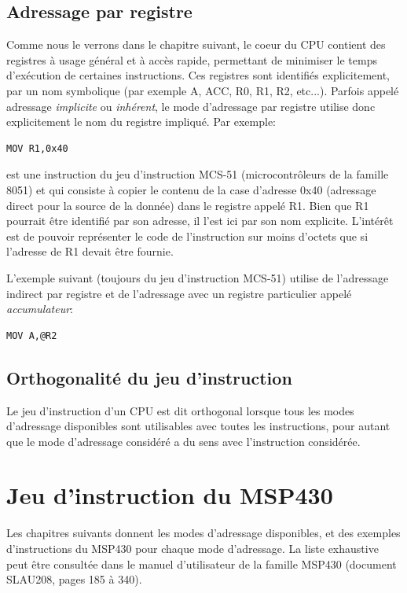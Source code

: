 \subsection{Adressage par registre}
Comme nous le verrons dans le chapitre suivant, le coeur du CPU contient des registres à usage général et à accès rapide, permettant de minimiser le temps d'exécution de certaines instructions. Ces registres sont identifiés explicitement, par un nom symbolique (par exemple A, ACC, R0, R1, R2, etc...).
Parfois appelé adressage \textit{implicite} ou \textit{inhérent}, le mode d'adressage par registre utilise donc explicitement le nom du registre impliqué. Par exemple:
\lstset{style=customc}
\begin{lstlisting}
MOV R1,0x40
\end{lstlisting}
est une instruction du jeu d'instruction MCS-51 (microcontrôleurs de la famille 8051) et qui consiste à copier le contenu de la case d'adresse 0x40 (adressage direct pour la source de la donnée) dans le registre appelé R1. Bien que R1 pourrait être identifié par son adresse, il l'est ici par son nom explicite. L'intérêt est de pouvoir représenter le code de l'instruction sur moins d'octets que si l'adresse de R1 devait être fournie.

L'exemple suivant (toujours du jeu d'instruction MCS-51) utilise de l'adressage indirect par registre et de l'adressage avec un registre particulier appelé \textit{accumulateur}:
\lstset{style=customc}
\begin{lstlisting}
MOV A,@R2
\end{lstlisting}

\subsection{Orthogonalité du jeu d'instruction}
Le jeu d'instruction d'un CPU est dit orthogonal lorsque tous les modes d'adressage disponibles sont utilisables avec toutes les instructions, pour autant que le mode d'adressage considéré a du sens avec l'instruction considérée.

\section{Jeu d'instruction du MSP430}
Les chapitres suivants donnent les modes d'adressage disponibles, et des exemples d'instructions du MSP430 pour chaque mode d'adressage. La liste exhaustive peut être consultée dans le manuel d'utilisateur de la famille MSP430 (document SLAU208, pages 185 à 340).

